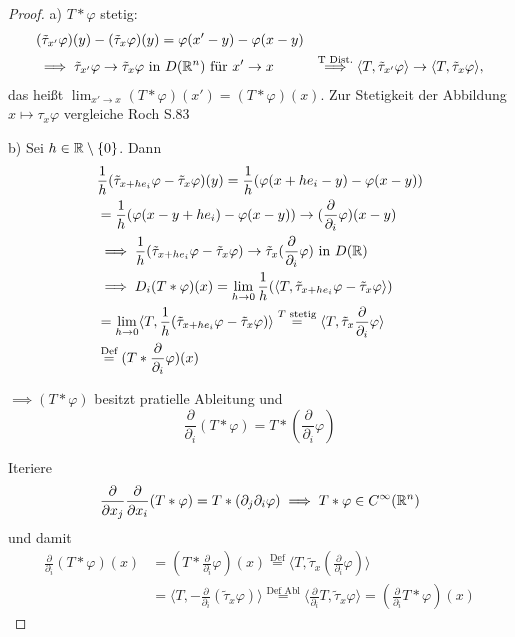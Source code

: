 \begin{proof}
  a) $T \ast \varphi$ stetig:
  \begin{align*}
  &(\tilde\tau_{x'}\varphi)(y) - (\tilde\tau_x\varphi)(y)
  = \varphi(x' - y) - \varphi(x - y)\\
  &\implies \tilde\tau_{x'} \varphi \to \tilde\tau_x \varphi \text{ in } D(\mathbb{R}^n) \text{ für } x' \to x
  &\overset{\text{T Dist.}}{\implies} \langle T, \tilde\tau_{x'} \varphi \rangle \to \langle T, \tilde\tau_x \varphi \rangle,
  \end{align*}
  das heißt $\lim_{x' \to x} (T \ast \varphi)(x') = (T \ast \varphi)(x)$.
  {\tiny{Zur Stetigkeit der Abbildung $x \mapsto \tau_x \varphi$ vergleiche Roch S.83}}

  b) Sei $h \in \mathbb{R}\setminus\{0\}$. Dann
  \begin{align*}
    &\frac{1}{h} (\tilde\tau_{x + he_i} \varphi - \tilde\tau_x \varphi)(y)
    = \frac{1}{h} (\varphi(x + he_i - y) - \varphi(x - y)) \\
    &= \frac{1}{h} (\varphi(x - y + he_i) - \varphi(x - y)) \to (\frac{\partial}{\partial_i} \varphi)(x - y)\\
    &\implies \frac{1}{h} ( \tilde\tau_{x + he_i} \varphi - \tilde\tau_x \varphi) \to \tilde\tau_x (\frac{\partial}{\partial_i} \varphi) \text{ in } D(\mathbb{R}) \\
    &\implies D_i(T \ast \varphi)(x) 
    = \lim_{h \to 0} \frac{1}{h} ( \langle T, \tilde \tau_{x + he_i} \varphi - \tilde\tau_x \varphi \rangle) \\
    &= \lim_{h \to 0} \langle T, \frac{1}{h} ( \tilde \tau_{x + he_i} \varphi - \tilde\tau_x \varphi )\rangle 
    \overset{T \text{ stetig}}{=} \langle T, \tilde\tau_x \frac{\partial}{\partial_i} \varphi \rangle \\
    &\overset{\text{Def}}{=} (T \ast \frac{\partial}{\partial_i} \varphi)(x)
  \end{align*}

  $\implies (T \ast \varphi)$ besitzt pratielle Ableitung und 
  $$
  \frac{\partial}{\partial_i} (T \ast \varphi) = T \ast (\frac{\partial}{\partial_i} \varphi)
  $$

  Iteriere
  $$
  \frac{\partial}{\partial x_j} \frac{\partial}{\partial x_i} (T \ast \varphi) = T \ast (\partial_j \partial_i \varphi) \implies T \ast \varphi \in C^\infty(\mathbb{R}^n)
  $$
  und damit
  \begin{align*}
    \frac{\partial}{\partial_i} (T \ast \varphi)(x) 
    &= (T \ast \frac{\partial}{\partial_i} \varphi)(x)
    \overset{\text{Def}}{=} \langle T, \tilde\tau_x (\frac{\partial}{\partial_i} \varphi) \rangle \\
    &= \langle T, -\frac{\partial}{\partial_i}(\tilde\tau_x \varphi) \rangle
    \overset{\text{Def Abl}}{=} \langle \frac{\partial}{\partial_i} T, \tilde\tau_x \varphi \rangle
    =(\frac{\partial}{\partial_i} T \ast \varphi)(x)
  \end{align*}
\end{proof}

